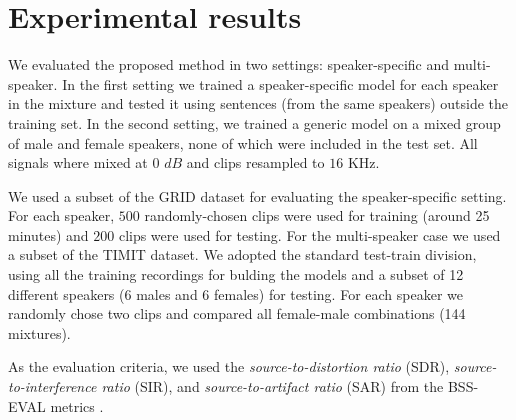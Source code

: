 \section{Experimental results}
\label{sec:experiments}


 We evaluated the proposed method in two settings: speaker-specific and multi-speaker. In the first setting 
we trained a speaker-specific model for each speaker in the mixture and tested it using sentences (from the same speakers) outside the training set. 
In the second setting, we trained a generic model on a mixed group of male and female speakers, none of which were included in the test set.
All signals where mixed at 0 $dB$ and clips resampled to $16$ KHz. 

 We used a subset of the GRID dataset \cite{cooke2006audio} for evaluating the speaker-specific setting.
For each speaker, $500$ randomly-chosen clips were used for training (around 25 minutes) and $200$ clips were used for testing.
For the multi-speaker case we used a subset of the TIMIT dataset. We adopted the standard test-train division, using all the training recordings for bulding the models
and a subset of 12 different speakers (6 males and 6 females) for testing. For each speaker we randomly chose two clips and compared
all female-male combinations (144 mixtures). 

 As the evaluation criteria, we used the \emph{source-to-distortion ratio} (SDR), \emph{source-to-interference ratio} (SIR), and
\emph{source-to-artifact ratio} (SAR) from the BSS-EVAL metrics \cite{vincent2006performance}. 
%
%

